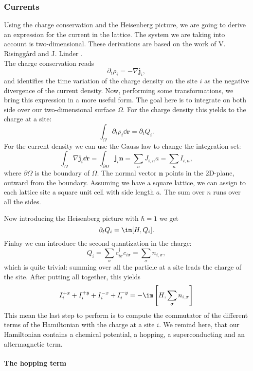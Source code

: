 \documentclass[../main.tex]{subfile}
\begin{document}
\subsubsection{Currents}
Using the charge conservation and the Heisenberg picture, we are going to derive an expression
for the current in the lattice. The system we are taking into account is two-dimensional.
These derivations are based on the work of V. Risinggård and J. Linder \cite{Risinggaard2019}.\\

The charge conservation reads
\[
    \partial_t \rho_i = - \nabla \bm{j}_i,
\]
and identifies the time variation of the charge density on the site $i$ as the negative divergence of the current density.
Now, performing some transformations, we bring this expression in a more useful form. The goal here is to integrate on both 
side over our two-dimensional surface $\Omega$. For the charge density this yields to the charge at a site:
\[
    \int_{\Omega} \partial_t \rho_i \dd \bm{r} = \partial_t Q_i.
\]
For the current density we can use the Gauss law to change the integration set:
\[
    \int_{\Omega} \nabla \bm{j}_i \dd \bm{r} = \int_{\partial \Omega} \bm{j}_i \bm{n} = \sum_{n} J_{i,n} a = \sum_{n} I_{i,n},
\]
where $\partial \Omega$ is the boundary of $\Omega$. The normal vector $\bm{n}$ points in the 2D-plane, outward from the boundary.
Assuming we have a square lattice, we can assign to each lattice site a square
unit cell with side length $a$. The sum over $n$ runs over all the sides.

Now introducing the Heisenberg picture with $\hbar = 1$ we get
\[
    \partial_t Q_i = \im [H, Q_i].
\]
Finlay we can introduce the second quantization in the charge:
\[
    Q_i = \sum_{\sigma} c_{i\sigma}^{\dagger}  c_{i\sigma} = \sum_{\sigma} n_{i,\sigma},
\]
which is quite trivial: summing over all the particle at a site leads the charge of the site. After putting all together, this yields
\begin{equation}\label{eq:CurrentSidesCommutator}
 I_{i}^{+x} +  I_{i}^{+y} +  I_{i}^{-x} +  I_{i}^{-y} = -\im \left[H, \sum_{\sigma} n_{i,\sigma}\right]
\end{equation}
This mean the last step to perform is to compute the commutator of the different terms of the Hamiltonian with the charge at a site $i$.
We remind here, that our Hamiltonian contains a chemical potential, a hopping, a superconducting and an altermagnetic term.

\paragraph{The hopping term} $~$\\
\end{document}
